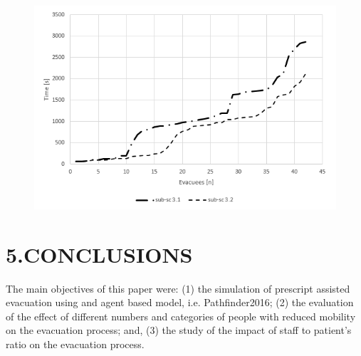 \documentclass{style/llncs}
\begin{document}
\begin{figure}[tbp]%
\begin{mdcenter}%

\noindent{}\includegraphics[keepaspectratio=true,width=\dimmin{}{\dimwidth{1.00}}]{images/evac-curve-scenario3}{}%

\mdhr{}%

\noindent{}%
\end{mdcenter}\label{fig-evac-curve-s3}%
\end{figure}%

\section{5.\hspace*{0.5em}CONCLUSIONS}\label{sec-conclusions}%

\noindent{}The main objectives of this paper were: (1) the simulation of prescript 
assisted evacuation using and agent based model, i.e. Pathfinder2016; 
(2) the evaluation of the effect of different numbers and categories 
of people with reduced mobility on the evacuation process; and, (3) 
the study of the impact of staff to patient’s ratio on the evacuation 
process.%
\end{document}
